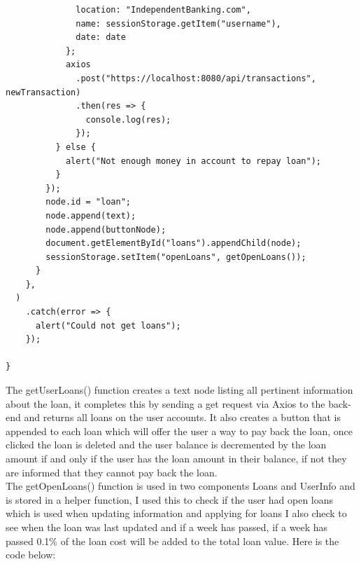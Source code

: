 \begin{verbatim}
              location: "IndependentBanking.com",
              name: sessionStorage.getItem("username"),
              date: date
            };
            axios
              .post("https://localhost:8080/api/transactions", newTransaction)
              .then(res => {
                console.log(res);
              });
          } else {
            alert("Not enough money in account to repay loan");
          }
        });
        node.id = "loan";
        node.append(text);
        node.append(buttonNode);
        document.getElementById("loans").appendChild(node);
        sessionStorage.setItem("openLoans", getOpenLoans());
      }
    },
  )
    .catch(error => {
      alert("Could not get loans");
    });

}
\end{verbatim}
The getUserLoans() function creates a text node listing all pertinent information about the loan, it completes this by sending a get request via Axios to the back-end and returns all loans on the user accounts.  It also creates a button that is appended to each loan which will offer the user a way to pay back the loan, once clicked the loan is deleted and the user balance is decremented by the loan amount if and only if the user has the loan amount in their balance, if not they are informed that they cannot pay back the loan.
\\
The getOpenLoans() function is used in two components Loans and UserInfo and is stored in a helper function, I used this to check if the user had open loans which is used when updating information and applying for loans I also check to see when the loan was last updated and if a week has passed, if a week has passed 0.1\% of the loan cost will be added to the total loan value. Here is the code below:
